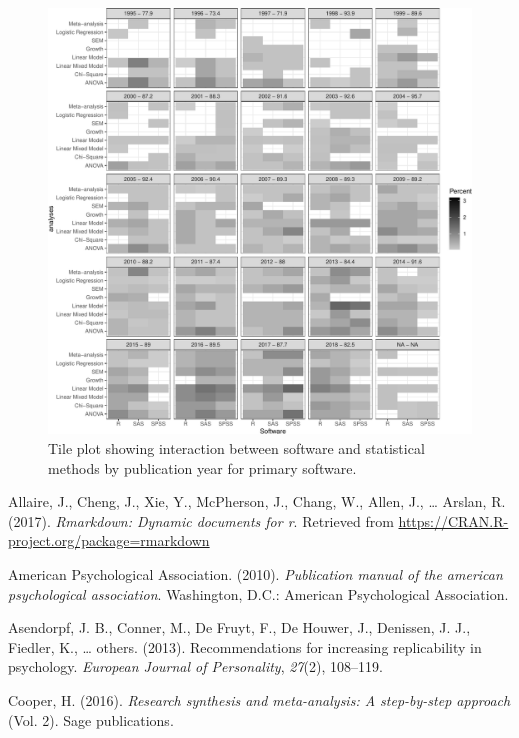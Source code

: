 \documentclass[english,,man]{apa6}
\theoremstyle{definition}
\theoremstyle{definition}
\theoremstyle{definition}
\theoremstyle{remark}
\begin{document}
\begin{figure}
\centering
\includegraphics{software_files/figure-latex/software-statmethods-year-1.pdf}
\caption{\label{fig:software-statmethods-year}Tile plot showing interaction
between software and statistical methods by publication year for primary
software.}
\end{figure}

\hypertarget{refs}{}
\leavevmode\hypertarget{ref-rmarkdown}{}%
Allaire, J., Cheng, J., Xie, Y., McPherson, J., Chang, W., Allen, J.,
\ldots{} Arslan, R. (2017). \emph{Rmarkdown: Dynamic documents for r}.
Retrieved from \url{https://CRAN.R-project.org/package=rmarkdown}

\leavevmode\hypertarget{ref-apa}{}%
American Psychological Association. (2010). \emph{Publication manual of
the american psychological association}. Washington, D.C.: American
Psychological Association.

\leavevmode\hypertarget{ref-asendorpf2013}{}%
Asendorpf, J. B., Conner, M., De Fruyt, F., De Houwer, J., Denissen, J.
J., Fiedler, K., \ldots{} others. (2013). Recommendations for increasing
replicability in psychology. \emph{European Journal of Personality},
\emph{27}(2), 108--119.

\leavevmode\hypertarget{ref-cooper2016}{}%
Cooper, H. (2016). \emph{Research synthesis and meta-analysis: A
step-by-step approach} (Vol. 2). Sage publications.
\end{document}
